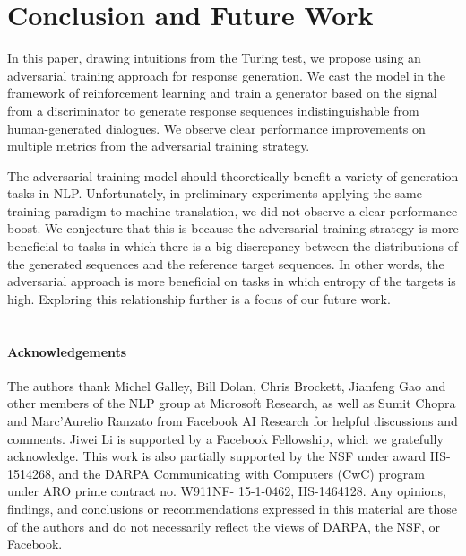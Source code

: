 \documentclass[11pt]{article}
\begin{document}
\section{Conclusion and Future Work}
In this paper, drawing  intuitions from the Turing test, we propose using an adversarial training approach for response generation. We cast the model in the framework of reinforcement learning and train a generator based on the signal from a discriminator to generate response sequences indistinguishable from human-generated dialogues.
We observe clear performance improvements on multiple metrics from the adversarial training strategy.

The adversarial training model should theoretically benefit a variety of generation tasks in NLP. Unfortunately, in preliminary experiments applying the same training paradigm to machine translation, we did not observe a clear performance boost. We conjecture that this is because the adversarial training strategy 
is more beneficial to
 tasks in which there is 
 a big discrepancy between the distributions of the generated sequences and the  reference target sequences. In other words, the adversarial approach is more beneficial on tasks in which entropy of the targets is  high. Exploring this relationship further is a focus of our future work. 
 ~~\\~~\\
 \paragraph{Acknowledgements}
 The authors thank Michel Galley, Bill Dolan, Chris Brockett, Jianfeng Gao 
and other members of the NLP group at Microsoft Research, as well as
 Sumit Chopra and Marc'Aurelio Ranzato from Facebook AI Research for helpful discussions and comments. 
Jiwei Li is supported by a Facebook Fellowship,  which we gratefully acknowledge. 
This work is also partially supported by the NSF under award
IIS-1514268, and the DARPA Communicating
with Computers (CwC) program under ARO prime
contract no. W911NF- 15-1-0462, IIS-1464128. Any opinions,
findings, and conclusions or recommendations expressed
in this material are those of the authors and
do not necessarily reflect the views of DARPA, the NSF,
or Facebook.
 



\end{document}
